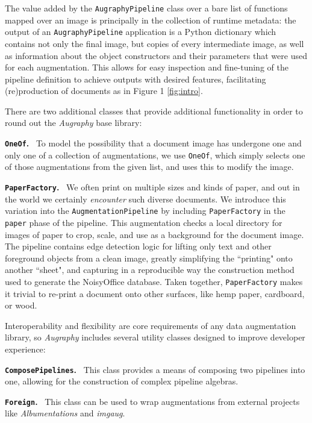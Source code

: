 \documentclass[runningheads]{llncs}
\begin{document}
The value added by the \texttt{AugraphyPipeline} class over a bare list of functions mapped over an image is principally in the collection of runtime metadata:
the output of an \texttt{AugraphyPipeline} application is a Python dictionary which contains not only the final image, but copies of every intermediate image, as well as information about the object constructors and their parameters that were used for each augmentation.
This allows for easy inspection and fine-tuning of the pipeline definition to achieve outputs with desired features, facilitating (re)production of documents as in Figure 1 \ref{fig:intro}.

\smallskip
There are two additional classes that provide additional functionality in order to round out the \emph{Augraphy} base library:

\noindent\textbf{\texttt{OneOf}.} ~To model the possibility that a document image has undergone one and only one of a collection of augmentations, we use \texttt{OneOf}, which simply selects one of those augmentations from the given list, and uses this to modify the image.

\smallskip
\noindent\textbf{\texttt{PaperFactory}.} ~We often print on multiple sizes and kinds of paper, and out in the world we certainly \textit{encounter} such diverse documents.
We introduce this variation into the \texttt{AugmentationPipeline} by including \texttt{PaperFactory} in the \texttt{paper} phase of the pipeline.
This augmentation checks a local directory for images of paper to crop, scale, and use as a background for the document image.
The pipeline contains edge detection logic for lifting only text and other foreground objects from a clean image, greatly simplifying the ``printing" onto another ``sheet", and capturing in a reproducible way the construction method used to generate the NoisyOffice database.
Taken together, \texttt{PaperFactory} makes it trivial to re-print a document onto other surfaces, like hemp paper, cardboard, or wood.

\smallskip
Interoperability and flexibility are core requirements of any data augmentation library, so \emph{Augraphy} includes several utility classes designed to improve developer experience:

\noindent\textbf{\texttt{ComposePipelines}.} ~This class provides a means of composing two pipelines into one, allowing for the construction of complex pipeline algebras.

\smallskip
\noindent\textbf{\texttt{Foreign}.} ~This class can be used to wrap augmentations from external projects like \emph{Albumentations} and \emph{imgaug}.
\end{document}
